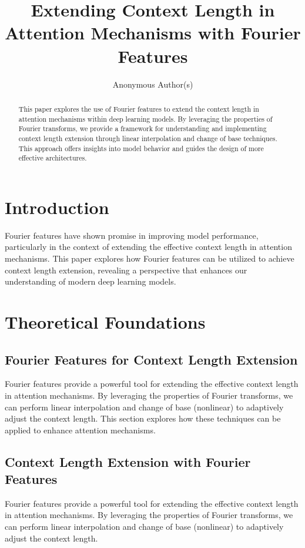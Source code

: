 \documentclass{article}
\title{Extending Context Length in Attention Mechanisms with Fourier Features}
\author{Anonymous Author(s)}
\begin{document}
\maketitle

\begin{abstract}
This paper explores the use of Fourier features to extend the context length in attention mechanisms within deep learning models. By leveraging the properties of Fourier transforms, we provide a framework for understanding and implementing context length extension through linear interpolation and change of base techniques. This approach offers insights into model behavior and guides the design of more effective architectures.
\end{abstract}

\section{Introduction}

Fourier features have shown promise in improving model performance, particularly in the context of extending the effective context length in attention mechanisms. This paper explores how Fourier features can be utilized to achieve context length extension, revealing a perspective that enhances our understanding of modern deep learning models.

\section{Theoretical Foundations}

\subsection{Fourier Features for Context Length Extension}

Fourier features provide a powerful tool for extending the effective context length in attention mechanisms. By leveraging the properties of Fourier transforms, we can perform linear interpolation and change of base (nonlinear) to adaptively adjust the context length. This section explores how these techniques can be applied to enhance attention mechanisms.

\subsection{Context Length Extension with Fourier Features}

Fourier features provide a powerful tool for extending the effective context length in attention mechanisms. By leveraging the properties of Fourier transforms, we can perform linear interpolation and change of base (nonlinear) to adaptively adjust the context length.
\end{document}
